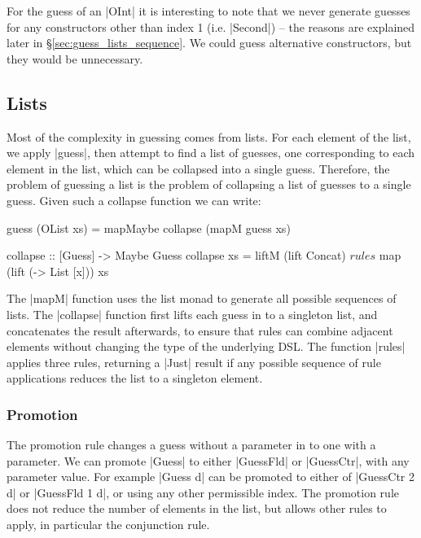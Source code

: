 \documentclass[preprint,draft]{sigplanconf}
\begin{document}
For the guess of an |OInt| it is interesting to note that we never generate guesses for any constructors other than index 1 (i.e. |Second|) -- the reasons are explained later in \S\ref{sec:guess_lists_sequence}. We could guess alternative constructors, but they would be unnecessary.

\subsection{Lists}
\label{sec:guess_lists}

Most of the complexity in guessing comes from lists. For each element of the list, we apply |guess|, then attempt to find a list of guesses, one corresponding to each element in the list, which can be collapsed into a single guess. Therefore, the problem of guessing a list is the problem of collapsing a list of guesses to a single guess. Given such a collapse function we can write:

\begin{code}
guess (OList xs) = mapMaybe collapse (mapM guess xs)

collapse :: [Guess] -> Maybe Guess
collapse xs = liftM (lift Concat) $ rules $
    map (lift (\x -> List [x])) xs
\end{code}

\begin{comment}
\begin{code}
rules :: [Guess] -> Maybe Guess
\end{code}
\end{comment}

The |mapM| function uses the list monad to generate all possible sequences of lists. The |collapse| function first lifts each guess in to a singleton list, and concatenates the result afterwards, to ensure that rules can combine adjacent elements without changing the type of the underlying DSL. The function |rules| applies three rules, returning a |Just| result if any possible sequence of rule applications reduces the list to a singleton element.

\subsubsection{Promotion}

The promotion rule changes a guess without a parameter in to one with a parameter. We can promote |Guess| to either |GuessFld| or |GuessCtr|, with any parameter value. For example |Guess d| can be promoted to either of |GuessCtr 2 d| or |GuessFld 1 d|, or using any other permissible index. The promotion rule does not reduce the number of elements in the list, but allows other rules to apply, in particular the conjunction rule.
\end{document}
